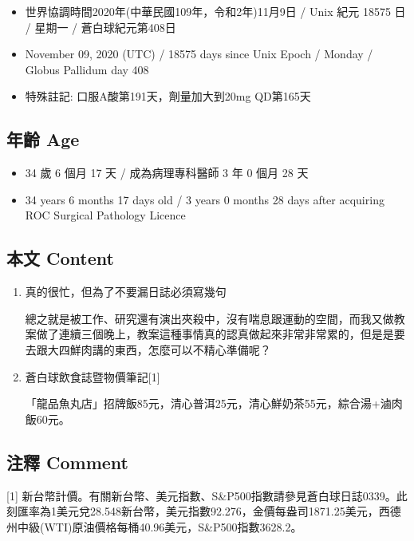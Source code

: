 \documentclass[
]{article}
\providecommand{\tightlist}{%
  \setlength{\itemsep}{0pt}\setlength{\parskip}{0pt}}
\begin{document}
\begin{itemize}
\tightlist
\item
  世界協調時間2020年(中華民國109年，令和2年)11月9日 / Unix 紀元 18575 日
  / 星期一 / 蒼白球紀元第408日
\item
  November 09, 2020 (UTC) / 18575 days since Unix Epoch / Monday /
  Globus Pallidum day 408
\item
  特殊註記: 口服A酸第191天，劑量加大到20mg QD第165天
\end{itemize}

\hypertarget{ux5e74ux9f61-age-64}{%
\subsection{年齡 Age}\label{ux5e74ux9f61-age-64}}

\begin{itemize}
\tightlist
\item
  34 歲 6 個月 17 天 / 成為病理專科醫師 3 年 0 個月 28 天
\item
  34 years 6 months 17 days old / 3 years 0 months 28 days after
  acquiring ROC Surgical Pathology Licence
\end{itemize}

\hypertarget{ux672cux6587-content-64}{%
\subsection{本文 Content}\label{ux672cux6587-content-64}}

\begin{enumerate}
\def\labelenumi{\arabic{enumi}.}
\item
  真的很忙，但為了不要漏日誌必須寫幾句

  總之就是被工作、研究還有演出夾殺中，沒有喘息跟運動的空間，而我又做教案做了連續三個晚上，教案這種事情真的認真做起來非常非常累的，但是是要去跟大四鮮肉講的東西，怎麼可以不精心準備呢？
\item
  蒼白球飲食誌暨物價筆記{[}1{]}

  「龍品魚丸店」招牌飯85元，清心普洱25元，清心鮮奶茶55元，綜合湯+滷肉飯60元。
\end{enumerate}

\hypertarget{ux6ce8ux91cb-comment-64}{%
\subsection{注釋 Comment}\label{ux6ce8ux91cb-comment-64}}

{[}1{]}
新台幣計價。有關新台幣、美元指數、S\&P500指數請參見蒼白球日誌0339。此刻匯率為1美元兌28.548新台幣，美元指數92.276，金價每盎司1871.25美元，西德州中級(WTI)原油價格每桶40.96美元，S\&P500指數3628.2。
\end{document}
